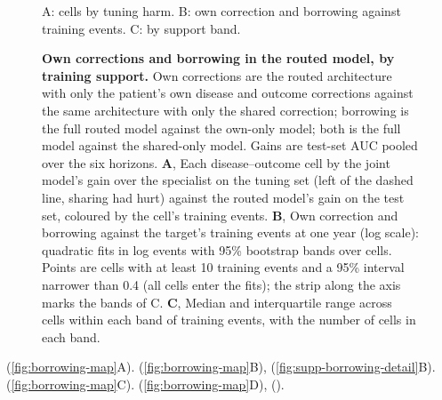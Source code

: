 \begin{figure}[H]
    {A: cells by tuning harm. B: own correction and borrowing against training
    events. C: by support band.}
  \caption{\textbf{Own corrections and borrowing in the routed model, by
  training support.} Own corrections are the routed architecture with only
  the patient's own disease and outcome corrections against the same
  architecture with only the shared correction; borrowing is the full routed
  model against the own-only model; both is the full model against the
  shared-only model. Gains are test-set AUC pooled over the six horizons.
  \textbf{A}, Each disease--outcome cell by the joint model's gain over the
  specialist on the tuning set (left of the dashed line, sharing had hurt)
  against the routed model's gain on the test set, coloured by the cell's
  training events. \textbf{B}, Own correction and borrowing against the
  target's training events at one year (log scale): quadratic fits in log
  events with 95\% bootstrap bands over cells. Points are cells with at least
  10 training events and a 95\% interval narrower than 0.4 (all cells enter the
  fits); the strip along the axis marks the bands of C. \textbf{C}, Median and
  interquartile range across cells within each band of training events, with
  the number of cells in each band.}
  \label{fig:hierarchy}
\end{figure}

\FloatBarrier
{}
 (\cref{fig:borrowing-map}A).  (\cref{fig:borrowing-map}B),
(\cref{fig:supp-borrowing-detail}B).  (\cref{fig:borrowing-map}C).
(\cref{fig:borrowing-map}D), 
().



